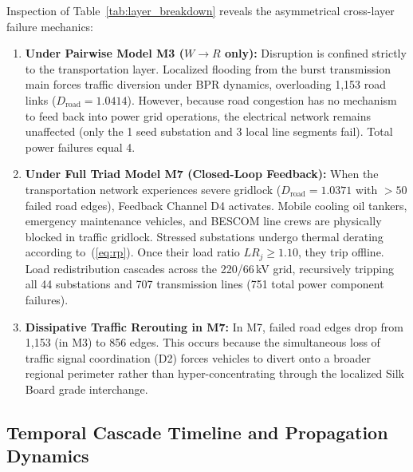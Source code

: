 \documentclass[oneside]{ieeeaccess}
\begin{document}
Inspection of Table~\ref{tab:layer_breakdown} reveals the asymmetrical cross-layer failure mechanics:
\begin{enumerate}
    \item \textbf{Under Pairwise Model M3 ($W \rightarrow R$ only):} Disruption is confined strictly to the transportation layer. Localized flooding from the burst transmission main forces traffic diversion under BPR dynamics, overloading 1,153 road links ($D_{\mathrm{road}} = 1.0414$). However, because road congestion has no mechanism to feed back into power grid operations, the electrical network remains unaffected (only the 1 seed substation and 3 local line segments fail). Total power failures equal 4.
    \item \textbf{Under Full Triad Model M7 (Closed-Loop Feedback):} When the transportation network experiences severe gridlock ($D_{\mathrm{road}} = 1.0371$ with $>50$ failed road edges), Feedback Channel D4 activates. Mobile cooling oil tankers, emergency maintenance vehicles, and BESCOM line crews are physically blocked in traffic gridlock. Stressed substations undergo thermal derating according to~(\ref{eq:rp}). Once their load ratio $LR_j \geq 1.10$, they trip offline. Load redistribution cascades across the 220/66\,kV grid, recursively tripping all 44 substations and 707 transmission lines (751 total power component failures).
    \item \textbf{Dissipative Traffic Rerouting in M7:} In M7, failed road edges drop from 1,153 (in M3) to 856 edges. This occurs because the simultaneous loss of traffic signal coordination (D2) forces vehicles to divert onto a broader regional perimeter rather than hyper-concentrating through the localized Silk Board grade interchange.
\end{enumerate}

\subsection{Temporal Cascade Timeline and Propagation Dynamics}
\end{document}

